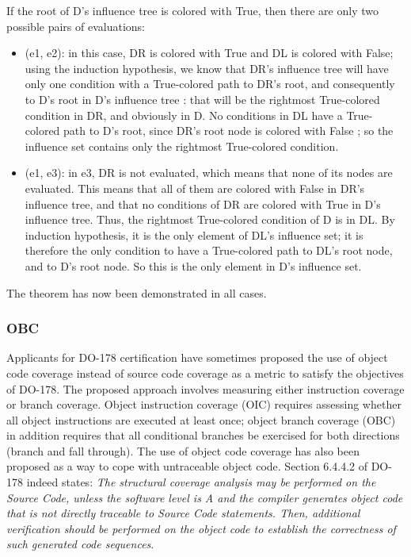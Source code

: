 \documentclass[a4paper,12pt,twoside]{article}
\begin{document}
\begin{itemize}
If the root of D's influence tree is colored with True, then there are only
two possible pairs of evaluations:

\begin{itemize}
\item (e1, e2): in this case, DR is colored with True and DL is colored with
False; using the induction hypothesis, we know that DR's influence tree
will have only one condition with a True-colored path to DR's root, and
consequently to D's root in D's influence tree : that will be the rightmost
True-colored condition in DR, and obviously in D. No conditions in DL
have a True-colored path to D's root, since DR's root node is colored with
False ; so the influence set contains only the rightmost True-colored
condition.
\item (e1, e3): in e3, DR is not evaluated, which means that none of its
nodes are evaluated. This means that all of them are colored with
False in DR's influence tree, and that no conditions of DR are colored
with True in D's influence tree. Thus, the rightmost True-colored condition
of D is in DL. By induction hypothesis, it is the only element of DL's
influence set; it is therefore the only condition to have a True-colored
path to DL's root node, and to D's root node. So this is the only element
in D's influence set.
\end{itemize}

\end{itemize}

The theorem has now been demonstrated in all cases. 

\subsubsection{OBC}

Applicants for DO-178 certification have sometimes proposed the use of object
code coverage instead of source code coverage as a metric to satisfy the
objectives of DO-178. The proposed approach involves measuring either
instruction coverage or branch coverage. Object instruction coverage
(OIC) requires assessing whether all object instructions are executed
at least once; object branch coverage (OBC) in addition requires that
all conditional branches be exercised for both directions (branch and
fall through). The use of object code coverage has also been proposed
as a way to cope with untraceable object code. Section 6.4.4.2 of
DO-178 indeed states: \emph{The structural coverage analysis may be
performed on the Source Code, unless the software level is A and the
compiler generates object code that is not directly traceable to Source
Code statements. Then, additional verification should be performed on
the object code to establish the correctness of such generated code
sequences}.
\end{document}
